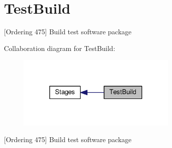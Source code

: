 \hypertarget{group__TestBuild}{\section{Test\-Build}
\label{group__TestBuild}
}


\mbox{[}Ordering 475\mbox{]} Build test software package  


Collaboration diagram for Test\-Build\-:
\nopagebreak
\begin{figure}[H]
\begin{center}
\leavevmode
\includegraphics[width=222pt]{group__TestBuild}
\end{center}
\end{figure}
\mbox{[}Ordering 475\mbox{]} Build test software package 